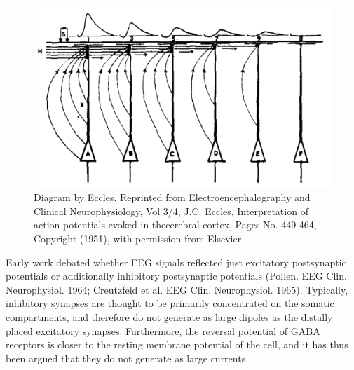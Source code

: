 \begin{figure}
  \begin{minipage}[c]{90mm}
    \includegraphics[width=\textwidth]{Figures/chapter1/Eccles_1951.png}
  \end{minipage}\hfill
  \begin{minipage}[c]{75mm}
    \caption{ 
    Diagram by Eccles. 
    Reprinted from Electroencephalography and Clinical Neurophysiology, Vol 3/4, J.C. Eccles, Interpretation of action potentials evoked in thecerebral cortex, Pages No. 449-464, Copyright (1951), with permission from Elsevier.
    \vfill
    } \label{fig:eccles}
    
  \end{minipage}
\end{figure}

Early work debated whether EEG signals reflected just excitatory postsynaptic potentials or additionally inhibitory postsynaptic potentials (Pollen. EEG Clin. Neurophysiol. 1964; Creutzfeld et al. EEG Clin. Neurophysiol. 1965). Typically, inhibitory synapses are thought to be primarily concentrated on the somatic compartments, and therefore do not generate as large dipoles as the distally placed excitatory synapses. Furthermore, the reversal potential of GABA receptors is closer to the resting membrane potential of the cell, and it has thus been argued that they do not generate as large currents. 

